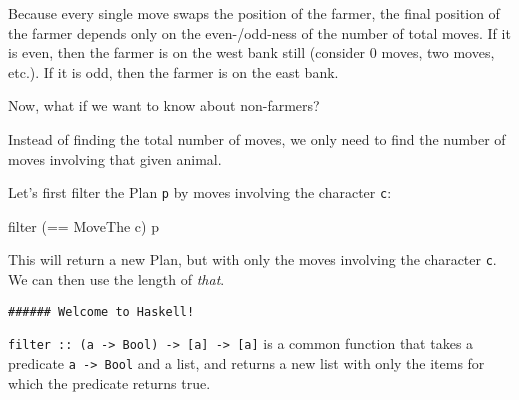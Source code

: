 \documentclass[]{article}
\newenvironment{Shaded}{}{}
\newcommand{\KeywordTok}[1]{\textcolor[rgb]{0.00,0.44,0.13}{\textbf{{#1}}}}
\newcommand{\DataTypeTok}[1]{\textcolor[rgb]{0.56,0.13,0.00}{{#1}}}
\newcommand{\OtherTok}[1]{\textcolor[rgb]{0.00,0.44,0.13}{{#1}}}
\newcommand{\FunctionTok}[1]{\textcolor[rgb]{0.02,0.16,0.49}{{#1}}}
\newcommand{\NormalTok}[1]{{#1}}
\begin{document}
Because every single move swaps the position of the farmer, the final position
of the farmer depends only on the even-/odd-ness of the number of total moves.
If it is even, then the farmer is on the west bank still (consider 0 moves, two
moves, etc.). If it is odd, then the farmer is on the east bank.

\begin{Shaded}
\end{Shaded}

Now, what if we want to know about non-farmers?

Instead of finding the total number of moves, we only need to find the number of
moves involving that given animal.

Let's first filter the Plan \texttt{p} by moves involving the character
\texttt{c}:

\begin{Shaded}
\begin{Highlighting}[]
\NormalTok{filter (}\FunctionTok{==} \DataTypeTok{MoveThe} \NormalTok{c) p}
\end{Highlighting}
\end{Shaded}

This will return a new Plan, but with only the moves involving the character
\texttt{c}. We can then use the length of \emph{that}.

\begin{verbatim}
###### Welcome to Haskell!
\end{verbatim}

\texttt{filter\ ::\ (a\ -\textgreater{}\ Bool)\ -\textgreater{}\ {[}a{]}\ -\textgreater{}\ {[}a{]}}
is a common function that takes a predicate \texttt{a\ -\textgreater{}\ Bool}
and a list, and returns a new list with only the items for which the predicate
returns true.
\end{document}
